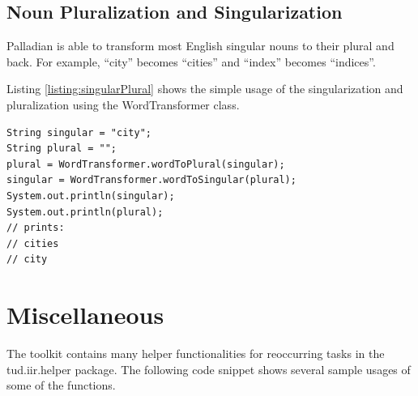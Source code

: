 \documentclass[a4paper,twoside]{book}      %
\begin{document}
\subsection{Noun Pluralization and Singularization}
Palladian is able to transform most English singular nouns to their plural and back. For example, ``city'' becomes ``cities'' and ``index'' becomes ``indices''.

Listing \ref{listing:singularPlural} shows the simple usage of the singularization and pluralization using the WordTransformer class.

\begin{codelisting}
\label{listing:singularPlural}
\begin{lstlisting}[frame=tb]
String singular = "city";
String plural = "";
plural = WordTransformer.wordToPlural(singular);
singular = WordTransformer.wordToSingular(plural);
System.out.println(singular);
System.out.println(plural);
// prints:
// cities
// city
\end{lstlisting}
\end{codelisting}

\section{Miscellaneous}
The toolkit contains many helper functionalities for reoccurring tasks in the tud.iir.helper package.
The following code snippet shows several sample usages of some of the functions.
\end{document}
